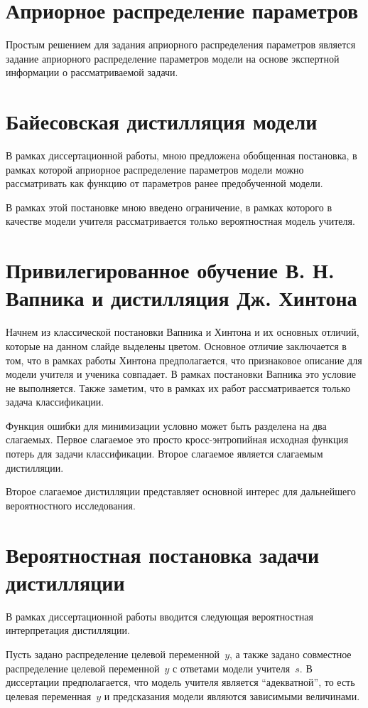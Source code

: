 \documentclass[10pt, twoside]{article}
\begin{document}
\section{Априорное распределение параметров}
Простым решением для задания априорного распределения параметров является задание априорного распределение параметров модели на основе экспертной информации о рассматриваемой задачи.

\section{Байесовская дистилляция модели}
В рамках диссертационной работы, мною предложена обобщенная постановка, в рамках которой априорное распределение параметров модели можно рассматривать как функцию от параметров ранее предобученной модели.

В рамках этой постановке мною введено ограничение, в рамках которого в качестве модели учителя рассматривается только вероятностная модель учителя.

\section{Привилегированное обучение В. Н. Вапника и дистилляция Дж. Хинтона}
Начнем из классической постановки Вапника и Хинтона и их основных отличий, которые на данном слайде выделены цветом. Основное отличие заключается в том, что в рамках работы Хинтона предполагается, что признаковое описание для модели учителя и ученика совпадает. В рамках постановки Вапника это условие не выполняется. Также заметим, что в рамках их работ рассматривается только задача классификации.

Функция ошибки для минимизации условно может быть разделена на два слагаемых. Первое слагаемое это просто кросс-энтропийная исходная функция потерь для задачи классификации. Второе слагаемое является слагаемым дистилляции.

Второе слагаемое дистилляции представляет основной интерес для дальнейшего вероятностного исследования.

\section{Вероятностная постановка задачи дистилляции}
В рамках диссертационной работы вводится следующая вероятностная интерпретация дистилляции.

Пусть задано распределение целевой переменной~$y$, а также задано совместное распределение целевой переменной~$y$ с ответами модели учителя~$s$. В диссертации предполагается, что модель учителя является ``адекватной'', то есть целевая переменная~$y$ и предсказания модели являются зависимыми величинами. 
\end{document}
